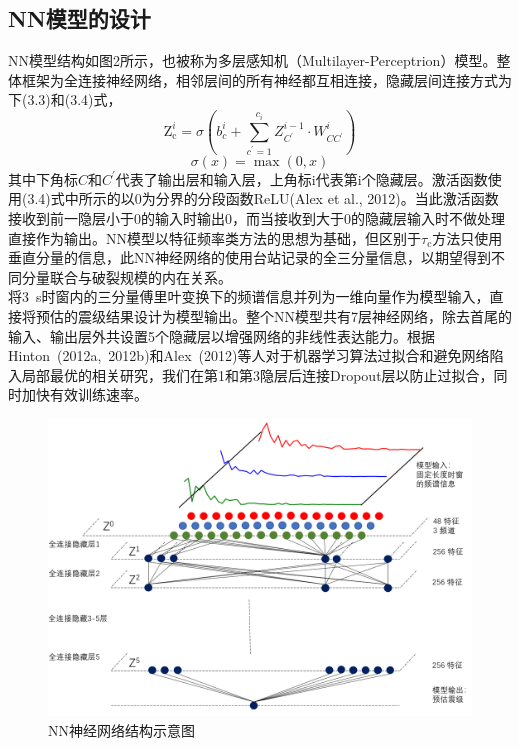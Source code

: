 \subsection{NN模型的设计}
\indent NN模型结构如图2所示，也被称为多层感知机（Multilayer-Perceptrion）模型。整体框架为全连接神经网络，相邻层间的所有神经都互相连接，隐藏层间连接方式为下(3.3)和(3.4)式，
\begin{equation}
\mathrm{Z}_{\mathrm{c}}^{i}=\sigma\left(b_{c}^{i}+\sum_{c^{\prime}=1}^{c_{i}} Z_{C^{\prime}}^{i-1} \cdot W_{C C^{\prime}}^{i}\right)
\end{equation}
\begin{equation}
\sigma(x)=\max (0, x)
\end{equation}
其中下角标$C$和$C^{\prime}$代表了输出层和输入层，上角标i代表第i个隐藏层。激活函数使用(3.4)式中所示的以0为分界的分段函数ReLU(Alex et al., 2012)。当此激活函数接收到前一隐层小于0的输入时输出0，而当接收到大于0的隐藏层输入时不做处理直接作为输出。NN模型以特征频率类方法的思想为基础，但区别于$\tau_{\mathrm{c}}$方法只使用垂直分量的信息，此NN神经网络的使用台站记录的全三分量信息，以期望得到不同分量联合与破裂规模的内在关系。\\
\indent 将3~s时窗内的三分量傅里叶变换下的频谱信息并列为一维向量作为模型输入，直接将预估的震级结果设计为模型输出。整个NN模型共有7层神经网络，除去首尾的输入、输出层外共设置5个隐藏层以增强网络的非线性表达能力。根据Hinton~(2012a,~2012b)和Alex~(2012)等人对于机器学习算法过拟合和避免网络陷入局部最优的相关研究，我们在第1和第3隐层后连接Dropout层以防止过拟合，同时加快有效训练速率。\\
 \begin{figure}[!h]%
	\centering  %
	\includegraphics[width=\linewidth]{img/NN.png}  %
	\caption{NN神经网络结构示意图}  %
	\label{fig:mcmthesis-logo}   %
\end{figure}


